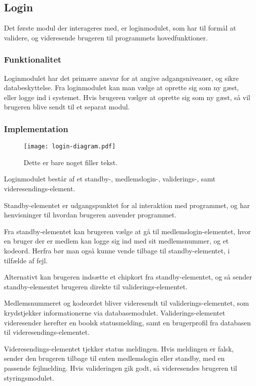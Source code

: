 \subsection{Login}
\label{sub:login}

Det første modul der interageres med, er loginmodulet, som har til formål at validere, og videresende brugeren til programmets hovedfunktioner.

\subsubsection{Funktionalitet}
\label{ssub:login_funktionalitet}

Loginmodulet har det primære ansvar for at angive adgangsniveauer, og sikre databeskyttelse. Fra loginmodulet kan man vælge at oprette sig som ny gæst, eller logge ind i systemet. Hvis brugeren vælger at oprette sig som ny gæst, så vil brugeren blive sendt til et separat modul.

\subsubsection{Implementation}
\label{ssub:login_implementation}

\begin{figure}
  \centering
  \texttt{[image: login-diagram.pdf]}
  \caption{Dette er bare noget filler tekst.}
\end{figure}


Loginmodulet består af et standby-, medlemslogin-, validerings-, samt videresendings-element.

Standby-elementet er udgangspunktet for al interaktion med programmet, og har henvisninger til hvordan brugeren anvender programmet. 

Fra standby-elementet kan brugeren vælge at gå til medlemslogin-elementet, hvor en bruger der er medlem kan logge sig ind med sit medlemsnummer, og et kodeord. Herfra bør man også kunne vende tilbage til standby-elementet, i tilfælde af fejl.

Alternativt kan brugeren indsætte et chipkort fra standby-elementet, og så sender standby-elementet brugeren direkte til validerings-elementet.

Medlemsnummeret og kodeordet bliver videresendt til validerings-elementet, som krydstjekker informationerne via databasemodulet. Validerings-elementet videresender herefter en boolsk statusmelding, samt en brugerprofil fra databasen til videresendings-elementet.

Videresendings-elementet tjekker status meldingen. Hvis meldingen er falsk, sender den brugeren tilbage til enten medlemslogin eller standby, med en passende fejlmelding. Hvis valideringen gik godt, så videresendes brugeren til styringsmodulet.
